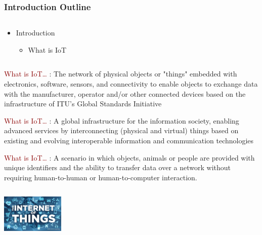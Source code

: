 \documentclass{beamer}
\begin{document}
\begin{frame}
	\frametitle{Introduction Outline}
	\begin{columns}[c]
		\begin{column}{30cm}
			\vspace{.1cm}
			\begin{itemize}
				\justifying
				\item Introduction
				\begin{itemize}
					\item What is IoT
				\end{itemize}
			\end{itemize}
		\end{column}
	\end{columns}
\end{frame}

\begin{frame}
	\begin{columns}
		\begin{column}{12cm}
			\begin{block}{\centering\textcolor{darkred}{What is IoT\ldots}}
				\justifying
				[Wikipedia]: The network of physical objects or "things" embedded with electronics, 	
				software, sensors, and connectivity to enable objects to exchange data with the
				manufacturer, operator and/or other connected devices based on the infrastructure of
				ITU's Global Standards Initiative
			\end{block}

			\begin{block}{\centering\textcolor{darkred}{What is IoT\ldots}}
				\justifying
				[ITU]: A global infrastructure for the information society, enabling advanced services
				by interconnecting (physical and virtual) things based on existing and evolving 		
				interoperable information and communication technologies
			\end{block}
			
			\begin{block}{\centering\textcolor{darkred}{What is IoT\ldots}}
				\justifying
				[WhatIs]: A scenario in which objects, animals or people are provided with unique
				identifiers and the ability to transfer data over a network without requiring 
				human-to-human or human-to-computer interaction.
			\end{block}
			
		\end{column}
	\end{columns}
	\vspace{.75cm}
	\hspace*{8.5cm}\includegraphics[width=3cm]{figs/Internet-of-Things-1.jpg}
\end{frame}
\end{document}
